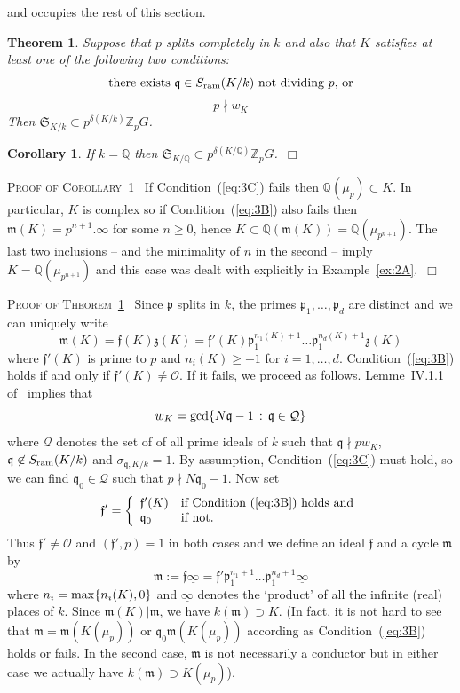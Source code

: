 \documentclass[12pt]{article}
\newtheorem{cor}{Corollary}[section]
\newtheorem{thm}{Theorem}[section]
\newcounter{rem}[section]%
\newcommand{\bbQ}{\ensuremath{\mathbb{Q}}}
\newcommand{\bbZ}{\ensuremath{\mathbb{Z}}}
\newcommand{\beql}[1]{\begin{equation}\label{#1}}
\newcommand{\cO}{\ensuremath{\mathcal{O}}}
\newcommand{\cQ}{\ensuremath{\mathcal{Q}}}
\newcommand{\eeq}{\end{equation}}
\newcommand{\ePf}{\hspace*{\fill}~$\Box$\vertsp\par}%
\newcommand{\ff}{\ensuremath{\mathfrak{f}}}
\newcommand{\fm}{\ensuremath{\mathfrak{m}}}
\newcommand{\fp}{\ensuremath{\mathfrak{p}}}
\newcommand{\fq}{\ensuremath{\mathfrak{q}}}
\newcommand{\fS}{\ensuremath{\mathfrak{S}}}
\newcommand{\fz}{\ensuremath{\mathfrak{z}}}
\newcommand{\ndiv}{\nmid}
\newcommand{\nin}{\not\in}
\newcommand{\refeq}[1]{~(\ref{eq:#1})}
\newcommand{\rem}{\refstepcounter{rem}\noindent{\sc Remark \therem}}%
\renewcommand{\therem}{\thesection.\arabic{rem}}
\newcommand{\vertsp}{\vspace{1ex}}
\newcommand{\SKk}{\ensuremath{\fS_{K/k}}}
\newcommand{\uinf}{\ensuremath{{\underline{\infty}}}}
\begin{document}
and occupies the rest of this section.
\begin{thm}\label{thm:3A}
Suppose that $p$ splits completely in $k$ and also that $K$ satisfies
at least one of the following two conditions:
\beql{eq:3B}
\mbox{there exists $\fq\in S_{\rm ram}(K/k)$ not dividing $p$, or}
\eeq
\beql{eq:3C}
p\ndiv w_K
\eeq
Then $\SKk\subset p^{\delta(K/k)}\bbZ_p G$.
\end{thm}
\begin{cor}\label{cor:3A}
If $k=\bbQ$ then
$\fS_{K/\bbQ}\subset p^{\delta(K/\bbQ)}\bbZ_p G$.\ePf
\end{cor}
\noindent \textsc{Proof of Corollary~\ref{cor:3A}\ } If Condition\refeq{3C}
fails then $\bbQ(\mu_p)\subset K$. In particular, $K$ is complex
so if Condition\refeq{3B} also
fails then $\fm(K)=p^{n+1}.\infty$ for some $n\geq 0$, hence
$K\subset\bbQ(\fm(K))=\bbQ(\mu_{p^{n+1}})$. The last two
inclusions -- and the minimality of $n$ in the second -- imply
$K=\bbQ(\mu_{p^{n+1}})$ and this case was dealt with explicitly
in Example~\ref{ex:2A}.\ePf
\noindent \textsc{Proof of Theorem~\ref{thm:3A}\ }
Since $\fp$ splits in $k$, the primes $\fp_1,\ldots,\fp_d$ are distinct
and we can uniquely write
\[
\fm(K)=\ff(K)\fz(K)=\ff'(K)\fp_1^{n_1(K)+1}\ldots\fp_1^{n_d(K)+1}\fz(K)
\]
where $\ff'(K)$ is prime to $p$ and $n_i(K)\geq -1$ for $i=1,\ldots,d$.
Condition\refeq{3B} holds if and only if  $\ff'(K)\neq\cO$.
If it fails, we proceed as follows.
Lemme~IV.1.1 of~\cite{Tate} implies that
\[
w_K={\rm gcd}\{N\fq-1\,:\,\fq\in \cQ \}
\]
where $\cQ$ denotes the set of of all prime ideals of $k$ such that
$\fq\ndiv pw_K$, $\fq\nin S_{\rm ram}(K/k)$ and $\sigma_{\fq,K/k}=1$.
By assumption, Condition\refeq{3C} must hold, so
we can find $\fq_0\in\cQ$ such that $p\ndiv N\fq_0-1$.
Now set
\[
\ff'=
\left\{
\begin{array}{ll}
\ff'(K)&
    \mbox{if Condition\refeq{3B} holds and}\\
\fq_0&
    \mbox{if not.}
\end{array}
\right.
\]
Thus $\ff'\neq\cO$ and $(\ff',p)=1$ in both cases and we define an ideal $\ff$ and
a cycle $\fm$ by
\beql{eq:3C.5}
\fm:=\ff\uinf=\ff'\fp_1^{n_1+1}\ldots\fp_1^{n_d+1}\uinf
\eeq
where $n_i={\rm max}\{n_i(K),0\}$ and $\uinf$ denotes the `product' of all the
infinite (real) places of $k$. Since $\fm(K)|\fm$, we have $k(\fm)\supset K$.
(In fact, it is not hard to see that
$\fm=\fm(K(\mu_p))$ or $\fq_0\fm(K(\mu_p))$ according as
Condition\refeq{3B} holds or fails. In the second
case, $\fm$ is not necessarily a conductor but in either case
we actually have $k(\fm)\supset K(\mu_p)$).
\end{document}
